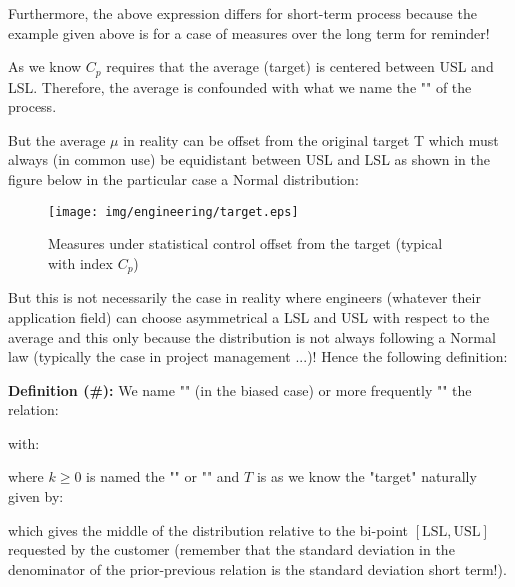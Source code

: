 Furthermore, the above expression differs for short-term process because the example given above is for a case of measures over the long term for reminder!

As we know $C_p$ requires that the average (target) is centered between USL and LSL. Therefore, the average is confounded with what we name the "" of the process.

But the average $\mu$ in reality can be offset from the original target T which must always (in common use) be equidistant between USL and LSL as shown in the figure below in the particular case a Normal distribution:

		\begin{figure}[H]
		\centering
		\texttt{[image: img/engineering/target.eps]}
		\caption{Measures under statistical control offset from the target (typical with index $C_p$)}
		\end{figure}

But this is not necessarily the case in reality where engineers (whatever their application field) can choose asymmetrical a LSL and USL with respect to the average and this only because the distribution is not always following a Normal law (typically the case in project management ...)! Hence the following definition:

\textbf{Definition (\#\mydef):} We name "" (in the biased case) or more frequently "" the relation:
	
	with:
	
	where $k\geq 0$ is named the "" or "" and $T$ is as we know the "target" naturally given by:
	
	which gives the middle of the distribution relative to the bi-point $[\text{LSL}, \text{USL}]$ requested by the customer (remember that the standard deviation in the denominator of the prior-previous relation is the standard deviation short term!).
	
